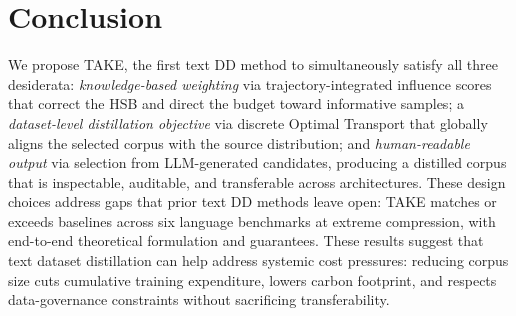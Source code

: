 \section{Conclusion} \label{sec:56-research03-conclusion}

\begin{foldable} %
  We propose TAKE, the first text \ac{DD} method to simultaneously satisfy all three desiderata: \textit{knowledge-based weighting} via trajectory-integrated influence scores that correct the \acl{HSB} and direct the budget toward informative samples; a \textit{dataset-level distillation objective} via discrete Optimal Transport that globally aligns the selected corpus with the source distribution; and \textit{human-readable output} via selection from \ac{LLM}-generated candidates, producing a distilled corpus that is inspectable, auditable, and transferable across architectures.
  These design choices address gaps that prior text \ac{DD} methods leave open: TAKE matches or exceeds baselines across six language benchmarks at extreme compression, with end-to-end theoretical formulation and guarantees.
  These results suggest that text dataset distillation can help address systemic cost pressures: reducing corpus size cuts cumulative training expenditure, lowers carbon footprint, and respects data-governance constraints without sacrificing transferability.
\end{foldable}
